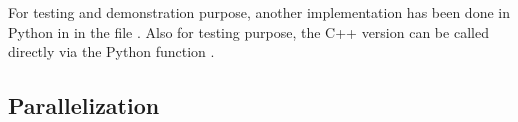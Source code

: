 For testing and demonstration purpose, another implementation has been done in Python in  in the file . Also for testing purpose, the C++ version can be called directly via the Python function .


\subsection{Parallelization}
\label{impl:parallelization}

